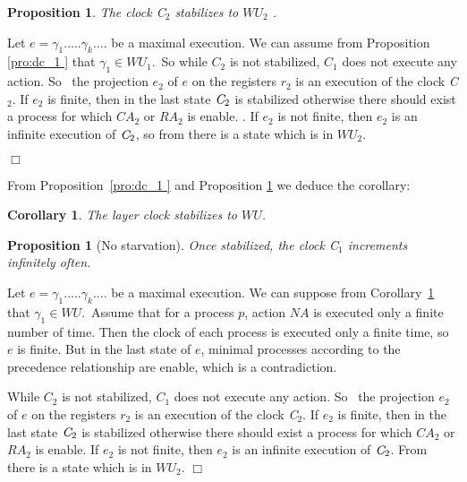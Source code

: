 \documentclass[11pt]{article}
\newenvironment{proof}{{\bf Proof. } }{{\hfill $\Box$}\vspace{.5pc}}
\newtheorem{corollary}[theorem]{Corollary}
\newtheorem{proposition}[theorem]{Proposition}
\begin{document}
\begin{proposition}
\label{pro:dc_2 }
The clock \emph{C}$_{2}$ stabilizes to $WU_{2}$ .
\end{proposition}

\begin{proof}
Let $e=\gamma _{1}.....\gamma _{k}....$ be a maximal execution. We can
assume from Proposition \ref{pro:dc_1 } that $\gamma _{1}\in WU_{1}$.\ So while $C_{2}$
is not stabilized, $C_{1}$ does not execute any action. So  \ the projection 
$e_{2}$ of $e$ on the registers $r_{2}$ is an execution of the clock \emph{C}
$_{2}$. If $e_{2}$ is finite, then in the last state $\emph{C}_{2}$ is
stabilized otherwise there should exist a process for which $CA_{2}$ or $RA_{2}$ is enable. . If $e_{2}$ is not finite, then $e_{2}$ is an infinite
execution of $\emph{C}_{2}$, so from \cite{BPV04b} there is a state which is in $WU_{2}$.


\end{proof}

From Proposition~\ref{pro:dc_1 } and Proposition \ref{pro:dc_2 } we deduce the corollary:

\begin{corollary}
\label{cor:WUstab-appendix}
The layer clock stabilizes to $WU$.
\end{corollary}

\begin{proposition}[No starvation]
Once stabilized, the clock \emph{C}$_{1}$ increments infinitely often.
\end{proposition}

\begin{proof}
Let $e=\gamma _{1}.....\gamma _{k}....$ be a maximal execution. We can
suppose from Corollary~\ref{cor:WUstab-appendix} that $\gamma _{1}\in WU$.\ Assume that for a
process $p$, action $NA$ is  executed only a finite number of time. Then the clock of
each process is executed only a finite time, so $e$ is finite. But in the
last state of $e$, minimal processes according to the precedence
relationship are enable, which is a contradiction.

While $C_{2}$ is not stabilized, $C_{1}$ does not execute any action. So \
the projection $e_{2}$ of $e$ on the registers $r_{2}$ is an execution of
the clock \emph{C}$_{2}$. If $e_{2}$ is finite, then in the last state $\emph{C}_{2}$ is stabilized otherwise there should exist a process for which 
$CA_{2}$ or $RA_{2}$ is enable. If $e_{2}$ is not finite, then $e_{2}$ is
an infinite execution of $\emph{C}_{2}$.  From~\cite{BPV04b} there is a state
which is in $WU_{2}$.
\end{proof}
\end{document}
